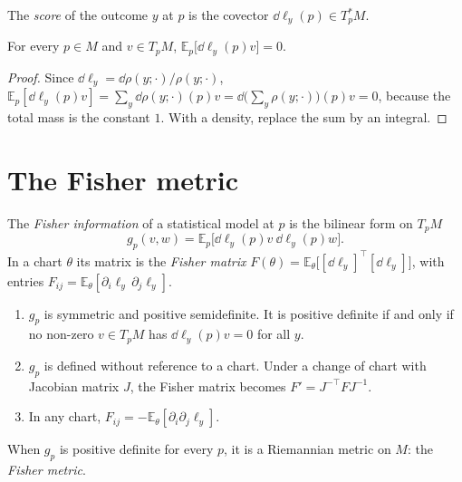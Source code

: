 \begin{notechapter}
\begin{definition}[Score]\label{natural-gradient:def:score}
The \emph{score} of the outcome $y$ at $p$ is the covector
$\dd\ell_y(p)\in T_p^*M$.
\end{definition}

\begin{lemma}\label{natural-gradient:lem:score}
For every $p\in M$ and $v\in T_pM$,
$\mathbb E_p\bigl[\dd\ell_y(p)v\bigr] = 0$.
\end{lemma}

\begin{proof}
Since $\dd\ell_y = \dd\rho(y; \cdot)/\rho(y; \cdot)$,
$\mathbb E_p[\dd\ell_y(p)v] = \sum_y\dd\rho(y; \cdot)(p)v
= \dd\bigl(\sum_y\rho(y; \cdot)\bigr)(p)v = 0$, because the total mass is
the constant $1$. With a density, replace the sum by an integral.
\end{proof}

\section{The Fisher metric}\label{natural-gradient:sec:fisher}

\begin{definition}\label{natural-gradient:def:fisher}
The \emph{Fisher information} of a statistical model at $p$ is the
bilinear form on $T_pM$
\[
  g_p(v, w) = \mathbb E_p\bigl[\dd\ell_y(p)v\ \dd\ell_y(p)w\bigr] .
\]
In a chart $\theta$ its matrix is the \emph{Fisher matrix}
$F(\theta) = \mathbb E_\theta\bigl[[\dd\ell_y]^\top[\dd\ell_y]\bigr]$,
with entries $F_{ij} = \mathbb E_\theta[\partial_i\ell_y\,\partial_j\ell_y]$.
\end{definition}

\begin{theorem}\label{natural-gradient:thm:fisher}
\begin{enumerate}[nosep]
  \item $g_p$ is symmetric and positive semidefinite. It is positive
        definite if and only if no non-zero $v\in T_pM$ has
        $\dd\ell_y(p)v = 0$ for all $y$.
  \item $g_p$ is defined without reference to a chart. Under a change of
        chart with Jacobian matrix $J$, the Fisher matrix becomes
        $F' = J^{-\top}FJ^{-1}$.
  \item In any chart,
        $F_{ij} = -\mathbb E_\theta[\partial_i\partial_j\ell_y]$.
\end{enumerate}
When $g_p$ is positive definite for every $p$, it is a Riemannian metric
on $M$: the \emph{Fisher metric}.
\end{theorem}


\end{notechapter}
